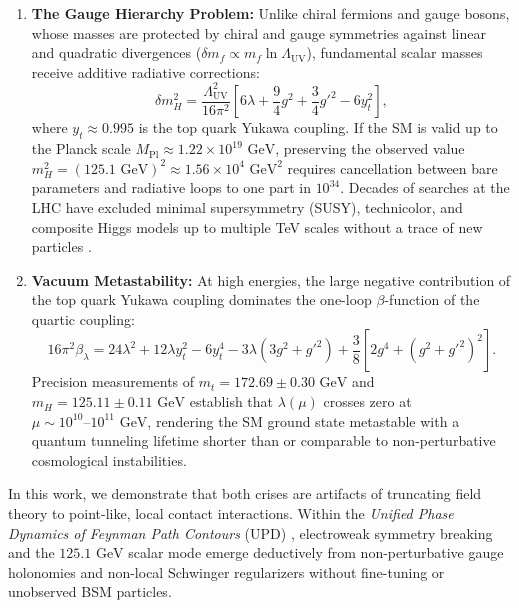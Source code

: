 \documentclass[11pt,a4paper]{article}
\begin{document}
\begin{enumerate}
    \item \textbf{The Gauge Hierarchy Problem:} Unlike chiral fermions and gauge bosons, whose masses are protected by chiral and gauge symmetries against linear and quadratic divergences ($\delta m_f \propto m_f \ln \Lambda_{\mathrm{UV}}$), fundamental scalar masses receive additive radiative corrections:
    \begin{equation}
    \delta m_H^2 = \frac{\Lambda_{\mathrm{UV}}^2}{16\pi^2} \left[ 6 \lambda + \frac{9}{4} g^2 + \frac{3}{4} g'^2 - 6 y_t^2 \right],
    \label{eq:SM_quadratic_div}
    \end{equation}
    where $y_t \approx 0.995$ is the top quark Yukawa coupling. If the SM is valid up to the Planck scale $M_{\mathrm{Pl}} \approx 1.22 \times 10^{19}\text{ GeV}$, preserving the observed value $m_H^2 = (125.1\text{ GeV})^2 \approx 1.56 \times 10^4\text{ GeV}^2$ requires cancellation between bare parameters and radiative loops to one part in $10^{34}$. Decades of searches at the LHC have excluded minimal supersymmetry (SUSY), technicolor, and composite Higgs models up to multiple TeV scales without a trace of new particles \cite{ParticleDataGroup2024}.
    \item \textbf{Vacuum Metastability:} At high energies, the large negative contribution of the top quark Yukawa coupling dominates the one-loop $\beta$-function of the quartic coupling:
    \begin{equation}
    16\pi^2 \beta_\lambda = 24 \lambda^2 + 12 \lambda y_t^2 - 6 y_t^4 - 3 \lambda (3 g^2 + g'^2) + \frac{3}{8} \left[ 2 g^4 + (g^2 + g'^2)^2 \right].
    \label{eq:beta_lambda}
    \end{equation}
    Precision measurements of $m_t = 172.69 \pm 0.30\text{ GeV}$ and $m_H = 125.11 \pm 0.11\text{ GeV}$ establish that $\lambda(\mu)$ crosses zero at $\mu \sim 10^{10}\text{--}10^{11}\text{ GeV}$, rendering the SM ground state metastable with a quantum tunneling lifetime shorter than or comparable to non-perturbative cosmological instabilities.
\end{enumerate}
In this work, we demonstrate that both crises are artifacts of truncating field theory to point-like, local contact interactions. Within the \textit{Unified Phase Dynamics of Feynman Path Contours} (UPD) \cite{PavliukMonograph2026, PavliukZenodo1, PavliukZenodo8}, electroweak symmetry breaking and the $125.1\text{ GeV}$ scalar mode emerge deductively from non-perturbative gauge holonomies and non-local Schwinger regularizers without fine-tuning or unobserved BSM particles.
\end{document}
